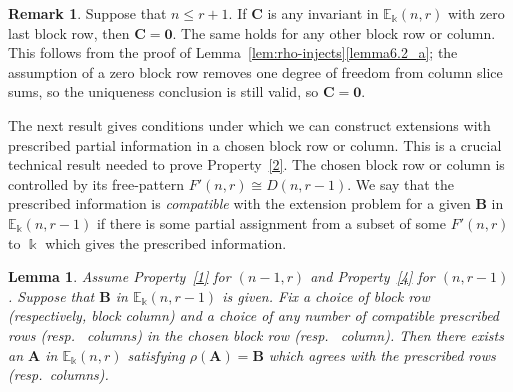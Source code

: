 \documentclass[10pt]{article}
\newtheorem{lemm}[theorem]{Lemma}
\theoremstyle{definition}
\newtheorem{rema}[theorem]{Remark}
\providecommand{\resp}{resp.\ }
\newcommand{\E}{\mathbb{E}}
\newcommand{\bA}{\mathbf{A}}
\newcommand{\bB}{\mathbf{B}}
\newcommand{\bC}{\mathbf{C}}
\newcommand{\bzero}{\mathbf{0}}
\begin{document}
\begin{rema}\label{rmk:sharper}
 Suppose that $n \le r+1$. If $\bC$ is any invariant in
 $\E_\Bbbk(n,r)$ with zero last block row, then $\bC = \bzero$. The
 same holds for any other block row or column. This follows from the
 proof of Lemma~\ref{lem:rho-injects}\ref{lemma6.2_a}; the assumption of a zero
 block row removes one degree of freedom from column slice sums, so
 the uniqueness conclusion is still valid, so $\bC=\bzero$.
\end{rema}

The next result gives conditions under which we can construct
extensions with prescribed partial information in a chosen block row
or column. This is a crucial technical result needed to prove
Property~\ref{2}. The chosen block row or column is controlled by its
free-pattern $F'(n,r) \cong D(n,r-1)$. We say that the prescribed
information is \emph{compatible} with the extension problem for a
given $\bB$ in $\E_\Bbbk(n,r-1)$ if there is some partial assignment
from a subset of some $F'(n,r)$ to $\Bbbk$ which gives the prescribed
information.



\begin{lemm}\label{lem:partial}
Assume Property~\ref{1} for $(n-1,r)$ and Property~\ref{4} for
$(n,r-1)$. Suppose that $\bB$ in $\E_\Bbbk(n,r-1)$ is given. Fix a
choice of block row \textup{(}respectively, block column\textup{)} and
a choice of any number of compatible prescribed rows \textup{(}\resp
columns\textup{)} in the chosen block row \textup{(}\resp
column\textup{)}. Then there exists an $\bA$ in $\E_\Bbbk(n,r)$
satisfying $\rho(\bA)=\bB$ which agrees with the prescribed rows
\textup{(}\resp columns\textup{)}.
\end{lemm}
\end{document}
